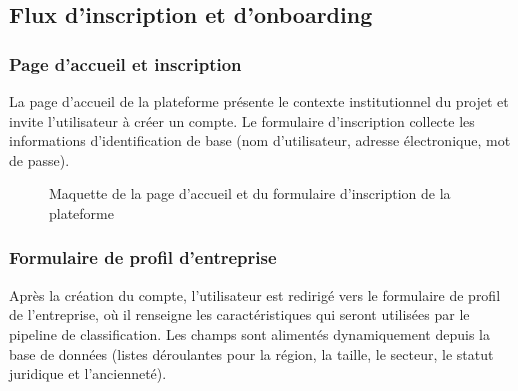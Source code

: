 \documentclass[12pt, a4paper, oneside]{report}
\begin{document}
\subsection{Flux d'inscription et d'onboarding}

\subsubsection{Page d'accueil et inscription}

La page d'accueil de la plateforme présente le contexte institutionnel du projet et invite l'utilisateur à créer un compte. Le formulaire d'inscription collecte les informations d'identification de base (nom d'utilisateur, adresse électronique, mot de passe).

\begin{figure}[H]
  \centering
  \caption{Maquette de la page d'accueil et du formulaire d'inscription de la plateforme}
  \label{fig:page_accueil}
\end{figure}

\subsubsection{Formulaire de profil d'entreprise}

Après la création du compte, l'utilisateur est redirigé vers le formulaire de profil de l'entreprise, où il renseigne les caractéristiques qui seront utilisées par le pipeline de classification. Les champs sont alimentés dynamiquement depuis la base de données (listes déroulantes pour la région, la taille, le secteur, le statut juridique et l'ancienneté).
\end{document}

